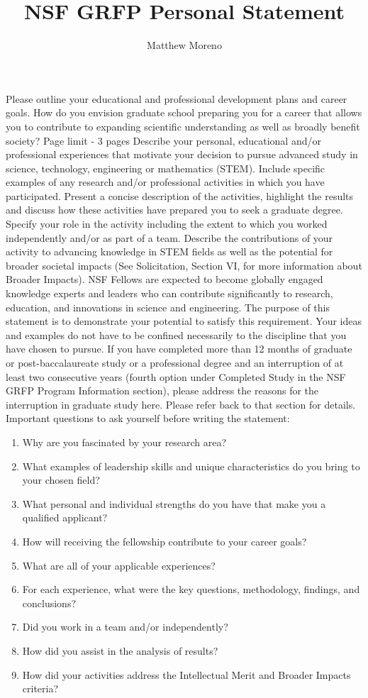 \documentclass[12pt]{book}
\title{NSF GRFP Personal Statement}
\author{Matthew Moreno}
\begin{document}
Please outline your educational and professional development plans and career goals. How do you envision graduate school preparing you for a career that allows you to contribute to expanding scientific understanding as well as broadly benefit society? Page limit - 3 pages
Describe your personal, educational and/or professional experiences that motivate your decision to pursue advanced study in science, technology, engineering or mathematics (STEM). Include specific examples of any research and/or professional activities in which you have participated. Present a concise description of the activities, highlight the results and discuss how these activities have prepared you to seek a graduate degree. Specify your role in the activity including the extent to which you worked independently and/or as part of a team. Describe the contributions of your activity to advancing knowledge in STEM fields as well as the potential for broader societal impacts (See Solicitation, Section VI, for more information about Broader Impacts).
NSF Fellows are expected to become globally engaged knowledge experts and leaders who can contribute significantly to research, education, and innovations in science and engineering. The purpose of this statement is to demonstrate your potential to satisfy this requirement. Your ideas and examples do not have to be confined necessarily to the discipline that you have chosen to pursue.
If you have completed more than 12 months of graduate or post-baccalaureate study or a professional degree and an interruption of at least two consecutive years (fourth option under Completed Study in the NSF GRFP Program Information section), please address the reasons for the interruption in graduate study here. Please refer back to that section for details.
Important questions to ask yourself before writing the statement:
\begin{enumerate}
	\item Why are you fascinated by your research area?
	\item What examples of leadership skills and unique characteristics do you bring to your chosen field?
	\item What personal and individual strengths do you have that make you a qualified applicant?
	\item How will receiving the fellowship contribute to your career goals?
	\item What are all of your applicable experiences?
	\item For each experience, what were the key questions, methodology, findings, and conclusions?
	\item Did you work in a team and/or independently?
	\item How did you assist in the analysis of results?
	\item How did your activities address the Intellectual Merit and Broader Impacts criteria?
\end{enumerate}
\end{document}
